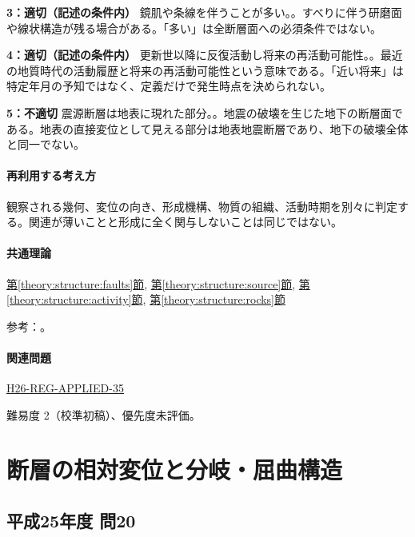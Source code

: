 \noindent\textbf{3：適切（記述の条件内）} 鏡肌や条線を伴うことが多い。。すべりに伴う研磨面や線状構造が残る場合がある。「多い」は全断層面への必須条件ではない。\par

\noindent\textbf{4：適切（記述の条件内）} 更新世以降に反復活動し将来の再活動可能性。。最近の地質時代の活動履歴と将来の再活動可能性という意味である。「近い将来」は特定年月の予知ではなく、定義だけで発生時点を決められない。\par

\noindent\textbf{5：不適切} 震源断層は地表に現れた部分。。地震の破壊を生じた地下の断層面である。地表の直接変位として見える部分は地表地震断層であり、地下の破壊全体と同一でない。\par

\paragraph{再利用する考え方} 観察される幾何、変位の向き、形成機構、物質の組織、活動時期を別々に判定する。関連が薄いことと形成に全く関与しないことは同じではない。

\paragraph{共通理論} \hyperref[theory:structure:faults]{第\ref*{theory:structure:faults}節}, \hyperref[theory:structure:source]{第\ref*{theory:structure:source}節}, \hyperref[theory:structure:activity]{第\ref*{theory:structure:activity}節}, \hyperref[theory:structure:rocks]{第\ref*{theory:structure:rocks}節}

\par 参考：\cite{str_source,str_faultrocks,str_activity}。

\paragraph{関連問題} \hyperref[q:h26-reg-applied-35]{H26-REG-APPLIED-35}

\par 難易度 2（校準初稿）、優先度未評価。

\section{断層の相対変位と分岐・屈曲構造}

\subsection{平成25年度 問20}
\label{q:h25-reg-applied-20}

